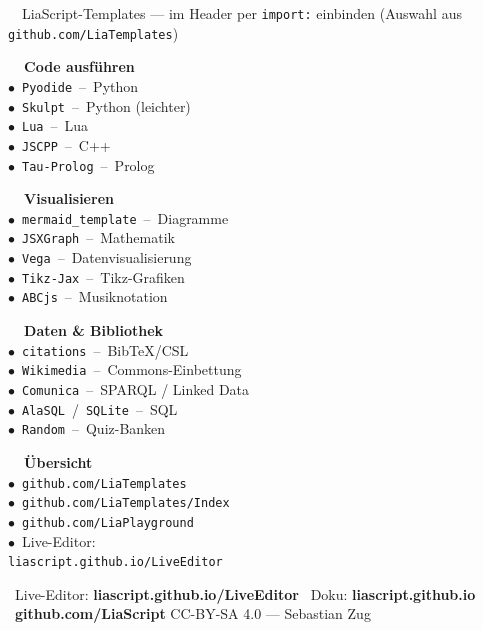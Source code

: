\documentclass[a4paper,landscape,9pt]{extarticle}
\begin{document}
\noindent
\begin{liainfo}{\faPuzzlePiece~~LiaScript-Templates — im Header per \texttt{import:} einbinden (Auswahl aus \texttt{github.com/LiaTemplates})}
\footnotesize
\begin{minipage}[t]{0.24\linewidth}
\textbf{\color{liagreen}\faTerminal~~Code ausführen}\\[1pt]
$\bullet$~\texttt{Pyodide}~–~Python\\
$\bullet$~\texttt{Skulpt}~–~Python (leichter)\\
$\bullet$~\texttt{Lua}~–~Lua\\
$\bullet$~\texttt{JSCPP}~–~C++\\
$\bullet$~\texttt{Tau-Prolog}~–~Prolog
\end{minipage}\hfill
\begin{minipage}[t]{0.24\linewidth}
\textbf{\color{liagreen}\faChartBar~~Visualisieren}\\[1pt]
$\bullet$~\texttt{mermaid\_template}~–~Diagramme\\
$\bullet$~\texttt{JSXGraph}~–~Mathematik\\
$\bullet$~\texttt{Vega}~–~Datenvisualisierung\\
$\bullet$~\texttt{Tikz-Jax}~–~Tikz-Grafiken\\
$\bullet$~\texttt{ABCjs}~–~Musiknotation
\end{minipage}\hfill
\begin{minipage}[t]{0.24\linewidth}
\textbf{\color{liagreen}\faDatabase~~Daten \& Bibliothek}\\[1pt]
$\bullet$~\texttt{citations}~–~BibTeX/CSL\\
$\bullet$~\texttt{Wikimedia}~–~Commons-Einbettung\\
$\bullet$~\texttt{Comunica}~–~SPARQL / Linked Data\\
$\bullet$~\texttt{AlaSQL}~/~\texttt{SQLite}~–~SQL\\
$\bullet$~\texttt{Random}~–~Quiz-Banken
\end{minipage}\hfill
\begin{minipage}[t]{0.24\linewidth}
\textbf{\color{liagreen}\faGithub~~Übersicht}\\[1pt]
$\bullet$~\texttt{github.com/LiaTemplates}\\
$\bullet$~\texttt{github.com/LiaTemplates/Index}\\
$\bullet$~\texttt{github.com/LiaPlayground}\\
$\bullet$~Live-Editor:\\
\hspace*{0.6em}\texttt{liascript.github.io/LiveEditor}
\end{minipage}
\end{liainfo}

\vspace{4pt}
{\sffamily\scriptsize\color{muted}
\faInfoCircle~Live-Editor: \textbf{liascript.github.io/LiveEditor}\hfill
\faBook~Doku: \textbf{liascript.github.io}\hfill
\faGithub~\textbf{github.com/LiaScript} \quad
CC-BY-SA 4.0 — Sebastian Zug}
\end{document}
